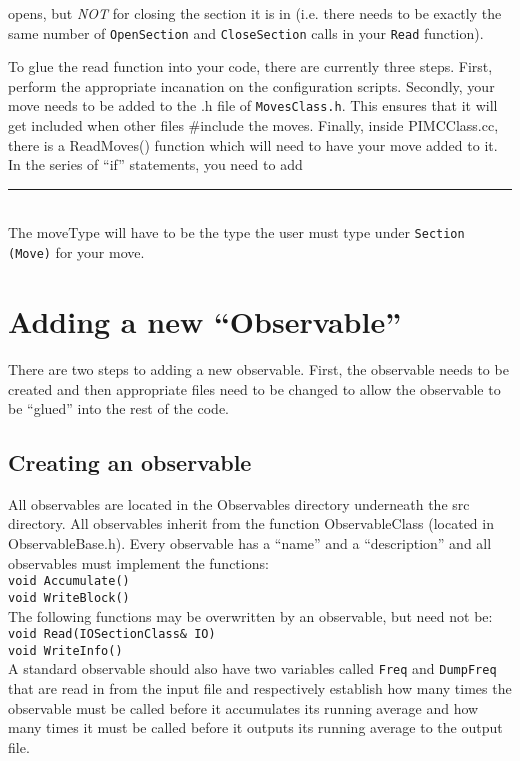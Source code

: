 \documentclass{book}
\begin{document}
opens, but {\em NOT} for closing the section it is in (i.e. there needs to
be exactly the same number of \texttt{OpenSection} and 
\texttt{CloseSection} calls in
your \texttt{Read} function).

To glue the read function into your code, there are currently three
steps. First, perform the appropriate incanation on the configuration scripts.
Secondly,  your move needs
to be added to the .h file of \texttt{MovesClass.h}. This ensures that it will
get included when other files \#include the moves. Finally, inside
PIMCClass.cc, there is a ReadMoves() function which will need to have your
move added to it.  In the series of ``if'' statements, you need to add
\rule{0.6cm}{0cm}\\
The moveType will have to be the type the user must type under
\texttt{Section (Move)} for your move.





\section{Adding a new ``Observable''}
There are two steps to adding a new observable. First, the observable
needs to be created and then appropriate files need to be changed to
allow the observable to be ``glued'' into the rest of the code.
\subsection{Creating an observable}
All observables are located in the Observables directory underneath
the src directory. All observables inherit from the function
ObservableClass (located in ObservableBase.h). Every observable has a
``name'' and a ``description'' and all
observables must implement the functions: \\
\texttt{void Accumulate()} \\
\texttt{void WriteBlock()} \\ 
The following functions may be overwritten by an observable, but need
not be: \\
\texttt{void Read(IOSectionClass\& IO)} \\
\texttt{void WriteInfo()} \\
A standard observable should also have two variables called \texttt{Freq} and
\texttt{DumpFreq} that are read in from the input file and respectively
establish how many times the observable must be called before it
accumulates its running average and how many times it must be called
before it outputs its running average to the output file.
\end{document}
